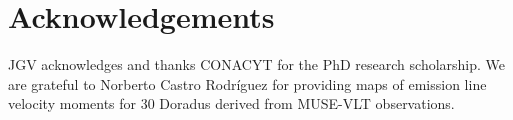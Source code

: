 \documentclass[fleqn,usenatbib, useAMS, a4paper]{mnras}
\begin{document}

\section*{Acknowledgements}

JGV acknowledges and thanks CONACYT for the PhD research scholarship. We are grateful to Norberto Castro Rodríguez for providing maps of emission line velocity moments for 30 Doradus derived from MUSE-VLT observations.













\end{document}
